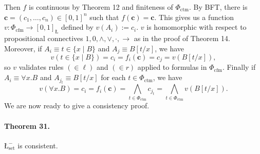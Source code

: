 \documentclass[10pt,a4paper]{article}
\newcommand{\Luk}{\text{\L}}
\begin{document}
Then $f$ is continuous by Theorem 12 and finiteness of $\Phi_{\mathrm{ctm}}$. By BFT, there is $\mathbf c=(c_1,\ldots,c_n)\in[0,1]^n$ such that $f(\mathbf c)=\mathbf c$. This gives us a function $v:\Phi_{\mathrm{cfm}}\to[0,1]_{\Luk}$ defined by $v(A_i):=c_i$.
$v$ is homomorphic with respect to propositional connectives $1,0,\wedge,\vee,\cdot,\to$ as in the proof of Theorem 14. Moreover, if $A_i\equiv t\in\{x\mid B\}$ and $A_j\equiv B[t/x]$, we have
\begin{equation}
 v(t\in\{x\mid B\})=c_i=f_i(\mathbf c)=c_j=v(B[t/x]),\tag{5}
\end{equation}
so $v$ validates rules $(\in\ell)$ and $(\in r)$ applied to formulas in $\Phi_{\mathrm{cfm}}$. Finally if $A_i\equiv\forall x.B$ and $A_{j_t}\equiv B[t/x]$ for each $t\in\Phi_{\mathrm{ctm}}$, we have
\begin{equation}
 v(\forall x.B)=c_i=f_i(\mathbf c)=\bigwedge_{t\in\Phi_{\mathrm{ctm}}}c_{j_t}
 =\bigwedge_{t\in\Phi_{\mathrm{ctm}}}v(B[t/x]).\tag{6}
\end{equation}
We are now ready to give a consistency proof.

\paragraph{Theorem 31.} $\Luk_{\mathrm{set}}^{-}$ is consistent.
\end{document}

